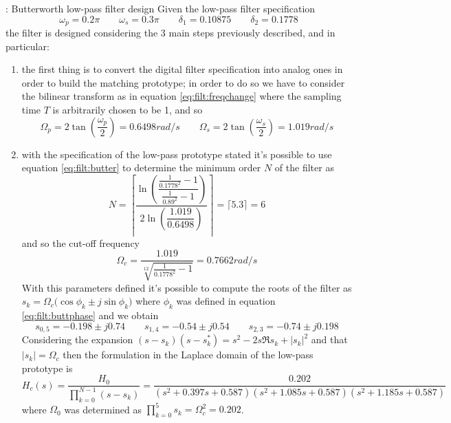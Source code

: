 		\begin{example}{: Butterworth low-pass filter design}
			Given the low-pass filter specification
			\[ \omega_p = 0.2\pi \qquad \omega_s = 0.3\pi \qquad \delta_1 = 0.10875 \qquad \delta_2 = 0.1778  \]
			the filter is designed considering the 3 main steps previously described, and in particular:
			\begin{enumerate}
				\item the first thing is to convert the digital filter specification into analog ones in order to build the matching prototype; in order to do so we have to consider the bilinear transform as in equation \ref{eq:filt:freqchange} where the sampling time $T$ is arbitrarily chosen to be 1, and so
				\[ \Omega_p = 2\tan\left( \frac{\omega_p}{2} \right) =0.6498 rad/s \qquad \Omega_s = 2\tan \left( \frac{\omega_s}{2} \right) = 1.019 rad/s \]
				
				\item with the specification of the low-pass prototype stated it's possible to use equation \ref{eq:filt:butter} to determine the minimum order $N$ of the filter as
				\[ N = \left\lceil \frac{\ln \left( \dfrac{\frac{1}{0.1778^2}-1}{\frac 1{0.89^2}-1} \right) }{2 \ln\left(\dfrac{1.019}{0.6498}\right)} \right\rceil = \big\lceil 5.3 \big\rceil = 6 \] 
				and so the cut-off frequency
				\[ \Omega_c = \frac{1.019}{\sqrt[12]{\frac{1}{0.1778^2}-1}} = 0.7662 rad/s \]
				With this parameters defined it's possible to compute the roots of the filter as $s_k = \Omega_c \big(\cos\phi_k \pm j \sin \phi_k\big)$ where $\phi_k$ was defined in equation \ref{eq:filt:buttphase} and we obtain
				\[ s_{0,5} = -0.198 \pm j 0.74 \qquad s_{1,4} = -0.54 \pm j 0.54 \qquad s_{2,3} = -0.74 \pm j 0.198 \] 
				Considering the expansion $(s-s_k)(s-s_k^*) = s^2- 2s\Re{s_k} + |s_k|^2$ and that $|s_k|= \Omega_c$ then the formulation in the Laplace domain of the low-pass prototype is
				\[ H_c(s) = \frac{H_0}{\prod_{k=0}^{N-1} (s-s_k) } = \frac{0.202}{ (s^2 + 0.397s + 0.587)(s^2+1.085s+0.587)(s^2+1.185s + 0.587) } \]
				where $\Omega_0$ was determined as $\prod_{k=0}^{5} s_k = \Omega_c^2 = 0.202$.
				

\end{enumerate}
\end{example}
